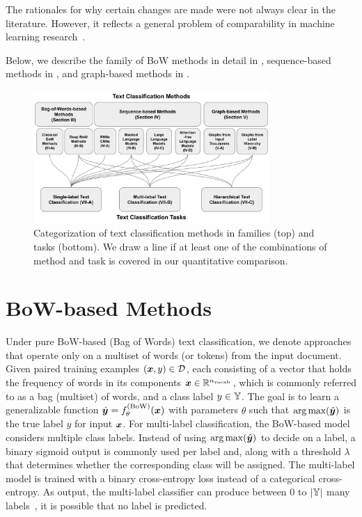 The rationales for why certain changes are made were not always clear in the literature.
However, it reflects a general problem of comparability in machine learning research~\cite{leech2024questionablepracticesmachinelearning}.

Below, we describe the family of BoW methods in detail in , 
sequence-based methods in , and graph-based methods in . 

\begin{figure}
    \centering
    \includegraphics[width=0.8\textwidth]{TextClfSurvey-Figure1}
    \caption{Categorization of text classification methods in families (top) and tasks (bottom). 
    We draw a line if at least one of the combinations of method and task is covered in our quantitative comparison.}
    \label{fig:one}

\end{figure}

\section{BoW-based Methods}\label{sec:bow}
Under pure BoW-based (Bag of Words) text classification, we denote approaches that operate only on a multiset of words (or tokens) from the input document. 
Given paired training examples $({\bm{x}},y) \in \mathcal{D}$, each consisting of a vector that holds the frequency of words in its components ${\bm{x}} \in {\mathbb{R}}^{n_\mathrm{vocab}}$, which is commonly referred to as a bag (multiset) of words, and a class label $y \in {\mathbb{Y}}$. 
The goal is to learn a generalizable function $\hat{{\bm{y}}} = f_\theta^{(\mathrm{BoW})}({\bm{x}})$ with parameters $\theta$ such that $\operatorname{arg\,max}(\hat{{\bm{y}}})$ is the true label $y$ for input ${\bm{x}}$.
For multi-label classification, the BoW-based model considers multiple class labels. 
Instead of using $\operatorname{arg\,max}(\hat{{\bm{y}}})$ to decide on a label, a binary sigmoid output is commonly used per label and, along with a threshold $\lambda$ that determines whether the corresponding class will be assigned. 
The multi-label model is trained with a binary cross-entropy loss instead of a categorical cross-entropy.
As output, the multi-label classifier can produce between $0$ to $|{\mathbb{Y}}|$ many labels~\cite{DBLP:journals/csur/Sebastiani02}, \ie it is possible that no label is predicted.

